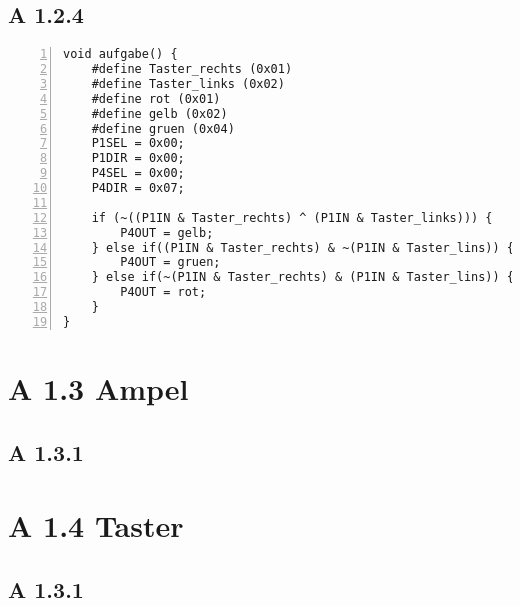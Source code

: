 \documentclass[11pt,a4paper,ngerman]{article}
\begin{document}
\subsection*{A 1.2.4}

\begin{lstlisting}[numbers=left]
void aufgabe() {
	#define Taster_rechts (0x01)
	#define Taster_links (0x02)
	#define rot (0x01)
	#define gelb (0x02)
	#define gruen (0x04)
	P1SEL = 0x00;
	P1DIR = 0x00;	
	P4SEL = 0x00;
	P4DIR = 0x07;
	
	if (~((P1IN & Taster_rechts) ^ (P1IN & Taster_links))) {
		P4OUT = gelb;
	} else if((P1IN & Taster_rechts) & ~(P1IN & Taster_lins)) {
		P4OUT = gruen;
	} else if(~(P1IN & Taster_rechts) & (P1IN & Taster_lins)) {
		P4OUT = rot;
	}
}
\end{lstlisting}

\section*{A 1.3 Ampel}
\subsection*{A 1.3.1}
\section*{A 1.4 Taster}
\subsection*{A 1.3.1}
\label{LastPage}
\end{document}
